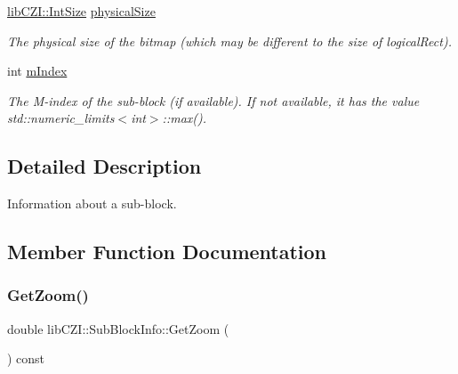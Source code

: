 \begin{DoxyCompactItemize}
\mbox{\label{structlib_c_z_i_1_1_sub_block_info_abfd40e11bbd325fb760b911588b25b0b}} 
\hyperlink{structlib_c_z_i_1_1_int_size}{lib\+C\+Z\+I\+::\+Int\+Size} \hyperlink{structlib_c_z_i_1_1_sub_block_info_abfd40e11bbd325fb760b911588b25b0b}{physical\+Size}
\begin{DoxyCompactList}\small\item\em The physical size of the bitmap (which may be different to the size of logical\+Rect). \end{DoxyCompactList}\item 
\mbox{\label{structlib_c_z_i_1_1_sub_block_info_a413dbeb605db073feaf280256ddc9715}} 
int \hyperlink{structlib_c_z_i_1_1_sub_block_info_a413dbeb605db073feaf280256ddc9715}{m\+Index}
\begin{DoxyCompactList}\small\item\em The M-\/index of the sub-\/block (if available). If not available, it has the value std\+::numeric\+\_\+limits$<$int$>$\+::max(). \end{DoxyCompactList}\end{DoxyCompactItemize}


\subsection{Detailed Description}
Information about a sub-\/block. 

\subsection{Member Function Documentation}
\mbox{\label{structlib_c_z_i_1_1_sub_block_info_ad39548c987b6e8d80730eb29c252dfef}} 
\subsubsection{\texorpdfstring{Get\+Zoom()}{GetZoom()}}
{\footnotesize\ttfamily double lib\+C\+Z\+I\+::\+Sub\+Block\+Info\+::\+Get\+Zoom (\begin{DoxyParamCaption}{ }\end{DoxyParamCaption}) const\hspace{0.3cm}{\ttfamily [inline]}}

